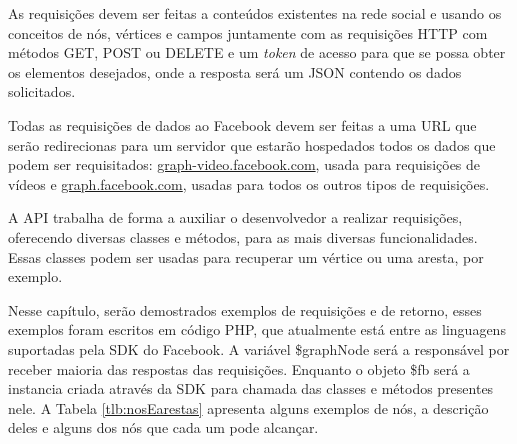 As requisições devem ser feitas a conteúdos existentes na rede social e usando os conceitos de nós, vértices e campos juntamente com as requisições HTTP com métodos GET, POST ou DELETE e um \textit{token} de acesso para que se possa obter os elementos desejados, onde a resposta será um JSON contendo os dados solicitados.

Todas as requisições de dados ao Facebook devem ser feitas a uma URL que serão redirecionas para um servidor que estarão hospedados todos os dados que podem ser requisitados: \url{graph-video.facebook.com}, usada para requisições de vídeos e \url{graph.facebook.com}, usadas para todos os outros tipos de requisições.

A API trabalha de forma a auxiliar o desenvolvedor a realizar requisições, oferecendo diversas classes e métodos, para as mais diversas funcionalidades. Essas classes podem ser usadas para recuperar um vértice ou uma aresta, por exemplo.

Nesse capítulo, serão demostrados exemplos de requisições e de retorno, esses exemplos foram escritos em código PHP, que atualmente está entre as linguagens suportadas pela SDK do Facebook. A variável \$graphNode será a responsável por receber maioria das respostas das requisições. Enquanto o objeto \$fb será a instancia criada através da SDK para chamada das classes e métodos presentes nele. A Tabela \ref{tlb:nosEarestas} apresenta alguns exemplos de nós, a descrição deles e alguns dos nós que cada um pode alcançar.

